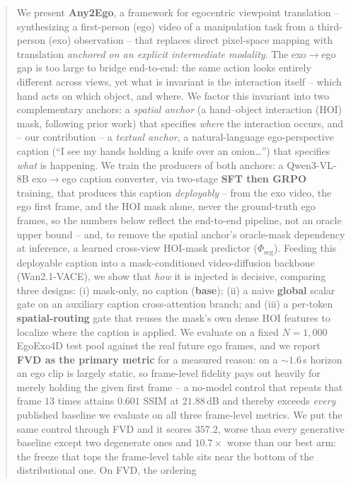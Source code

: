 \documentclass{article} %
\begin{document}
\begin{abstract}
We present \textbf{Any2Ego}, a framework for egocentric viewpoint translation
-- synthesizing a first-person (ego) video of a manipulation task from a
third-person (exo) observation -- that replaces direct pixel-space mapping with
translation \emph{anchored on an explicit intermediate modality}. The
exo$\to$ego gap is too large to bridge end-to-end: the same action looks
entirely different across views, yet what is invariant is the interaction
itself -- which hand acts on which object, and where. We factor this invariant
into two complementary anchors: a \emph{spatial anchor} (a hand--object
interaction (HOI) mask, following prior work) that specifies \emph{where} the
interaction occurs, and -- our contribution -- a \emph{textual anchor}, a
natural-language ego-perspective caption
(``I see my hands holding a knife over an onion\dots'') that specifies
\emph{what} is happening. We train the producers of both anchors: a
Qwen3-VL-8B exo$\to$ego caption converter, via two-stage \textbf{SFT then
GRPO} training, that produces this caption \emph{deployably} -- from the exo
video, the ego first frame, and the HOI mask alone, never the ground-truth
ego frames, so the numbers below reflect the end-to-end pipeline, not an
oracle upper bound -- and, to remove the spatial anchor's oracle-mask
dependency at inference, a learned cross-view HOI-mask predictor
($\Phi_{\text{seg}}$). Feeding this deployable caption into a
mask-conditioned video-diffusion backbone (Wan2.1-VACE), we show that
\emph{how} it is injected is decisive, comparing three designs: (i)
mask-only, no caption (\textbf{base}); (ii) a naive \textbf{global} scalar
gate on an auxiliary caption cross-attention branch; and (iii) a per-token
\textbf{spatial-routing} gate that reuses the mask's own dense HOI features
to localize where the caption is applied. We evaluate on a fixed
$N{=}1{,}000$ EgoExo4D test pool against the real future ego frames, and we
report \textbf{FVD as the primary metric} for a measured reason: on a
$\sim\!1.6$\,s horizon an ego clip is largely static, so frame-level
fidelity pays out heavily for merely holding the given first frame -- a
no-model control that repeats that frame $13$ times attains $0.601$ SSIM at
$21.88$\,dB and thereby exceeds \emph{every} published baseline we evaluate
on all three frame-level metrics. We put the same control through FVD and it
scores $357.2$, worse than every generative baseline except two degenerate
ones and $10.7\times$ worse than our best arm: the freeze that tops the
frame-level table sits near the bottom of the distributional one. On FVD, the ordering

\end{abstract}
\end{document}
